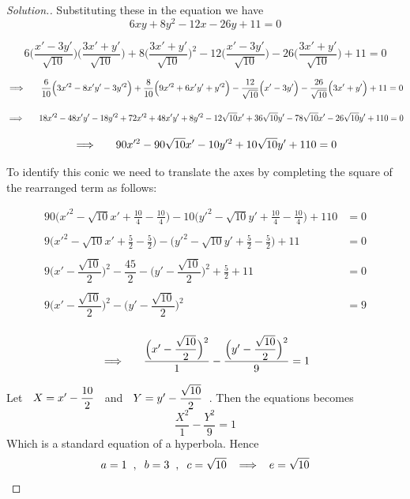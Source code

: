 \documentclass[11pt,a4paper]{article}
\theoremstyle{definition}
\newenvironment{solution}
  {\renewcommand{\qedsymbol}{}\begin{proof}[\textit{Solution}.]}
  {\end{proof}}
\begin{document}
\begin{solution}
Substituting these in the equation we have
$$6xy + 8y^2 - 12x - 26y + 11 = 0$$

$$6\Bigg(\dfrac{x' - 3y'}{\sqrt{10}}\Bigg)\Bigg(\dfrac{3x' + y'}{\sqrt{10}}\Bigg) + 8\Bigg(\dfrac{3x' + y'}{\sqrt{10}}\Bigg)^2 - 12\Bigg(\frac{x' - 3y'}{\sqrt{10}}\Bigg) - 26\Bigg(\frac{3x' + y'}{\sqrt{10}}\Bigg) + 11 = 0$$

$$\implies\hspace{0.5cm} \dfrac{6}{10}\Big(3x'^2 - 8x'y' - 3y'^2\Big) + \dfrac{8}{10}\Big(9x'^2 + 6x'y' + y'^2\Big) - \dfrac{12}{\sqrt{10}}\Big(x' - 3y'\Big) - \dfrac{26}{\sqrt{10}}\Big(3x' + y'\Big) + 11 = 0$$

$$\implies\hspace{0.5cm} 18x'^2 - 48x'y' - 18y'^2 + 72x'^2 + 48x'y' + 8y'^2 - 12\sqrt{10}x' + 36\sqrt{10}y' - 78\sqrt{10}x' - 26\sqrt{10}y' + 110 = 0$$

$$\implies\hspace{0.5cm} 90x'^2 - 90\sqrt{10}x' - 10y'^2 + 10\sqrt{10}y' + 110 = 0$$

To identify this conic we need to translate the axes by completing the square of the rearranged term as follows:

\begin{align*}
90\Big( x'^2 -\sqrt{10}x' + \frac{10}{4} - \frac{10}{4}\Big) - 10\Big(y'^2 - \sqrt{10}y' +\frac{10}{4} - \frac{10}{4}\Big) + 110 & = 0\\\\
9\Big(x'^2 - \sqrt{10}x' + \frac{5}{2} - \frac{5}{2}\Big) - \Big(y'^2 - \sqrt{10}y' + \frac{5}{2} - \frac{5}{2}\Big) + 11 & = 0\\\\
9\Big(x' - \dfrac{\sqrt{10}}{2}\Big)^2 - \dfrac{45}{2} - \Big(y' - \dfrac{\sqrt{10}}{2}\Big)^2 + \frac{5}{2} + 11 & = 0\\\\
9\Bigg(x' -\dfrac{\sqrt{10}}{2}\Bigg)^2 - \Bigg(y' - \dfrac{\sqrt{10}}{2}\Bigg)^2 & = 9\\
\end{align*}

$$\implies\hspace{0.5cm} \frac{\Big(x' - \dfrac{\sqrt{10}}{2}\Big)^2}{1} - \frac{\Big(y' - \dfrac{\sqrt{10}}{2}\Big)^2}{9}=1$$


Let $\hspace{0.2cm} X = x' - \dfrac{10}{2}\hspace{0.2cm}$ and $\hspace{0.2cm} Y = y' - \dfrac{\sqrt{10}}{2}\hspace{0.2cm}$. Then the equations becomes $$\dfrac{X^2}{1}- \dfrac{Y^2}{9} = 1$$ Which is a standard equation of a hyperbola. Hence $$a = 1\hspace{0.2cm},\hspace{0.2cm}b = 3\hspace{0.2cm},\hspace{0.2cm} c = \sqrt{10}\hspace{0.2cm}\implies\hspace{0.2cm} e = \sqrt{10}$$


\end{solution}
\end{document}
